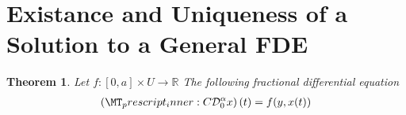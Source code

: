 \documentclass{article}
\begin{document}
\setlength\parindent{0pt}
\setlength{\parskip}{5mm plus4mm minus3mm}
\fancyfoot[r]{\today}
\newtheorem{theorem}{Theorem}
\newtheorem{lemma}{Lemma}
\newtheorem{definition}{Definition}
\newtheorem{corollary}{Corollary}
\newcommand{\laplace}[1]{ \mathcal{L} \left\{ #1 \right\} }
\newcommand{\rld}[3]{ \left( \mathcal{D}_{#1}^{#2} #3 \right) }
\newcommand{\rli}[3]{ \left( I_{#1}^{#2} #3 \right) }
\newcommand{\der}[3]{ \frac{d^{#3}#1}{d#2^{#3}} }
\newcommand{\capder}[3]{ \left( \prescript{C}{}{\mathcal{D}_{#1}^{#2}} #3 \right) }
\section*{Existance and Uniqueness of a Solution to a General FDE}

\begin{theorem}
	Let $ f : [0, a] \times U \longrightarrow \mathbb{R} $
	The following fractional differential equation
	\begin{align}
		\capder{0}{\alpha}{x}(t) &= f(y, x(t)) \\
	\end{align}
\end{theorem}


\end{document}
